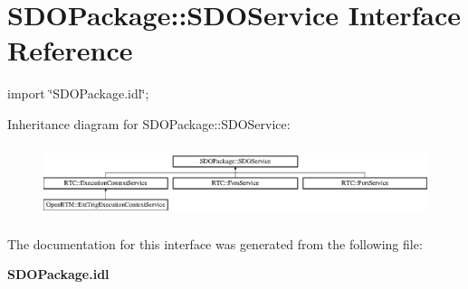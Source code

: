 \section{SDOPackage::SDOService Interface Reference}
\label{interfaceSDOPackage_1_1SDOService}


{\ttfamily import \char`\"{}SDOPackage.idl\char`\"{};}

Inheritance diagram for SDOPackage::SDOService:\begin{figure}[H]
\begin{center}
\leavevmode
\includegraphics[height=2.12928cm]{interfaceSDOPackage_1_1SDOService}
\end{center}
\end{figure}


The documentation for this interface was generated from the following file:\begin{DoxyCompactItemize}
\item 
{\bf SDOPackage.idl}\end{DoxyCompactItemize}
